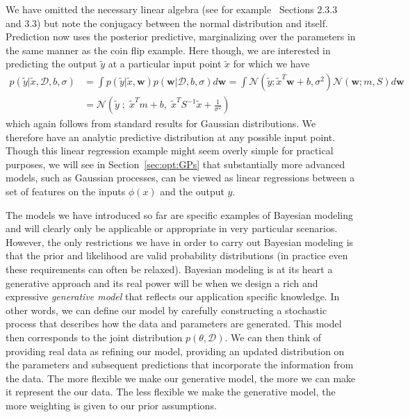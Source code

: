 We have omitted the necessary linear algebra (see for example~\cite{bishop2006pattern}
Sections 2.3.3 and 3.3)
but note the conjugacy between
the normal distribution and itself.  Prediction now uses the posterior predictive, marginalizing
over the parameters in the same manner as the coin flip example.  Here though, we are interested
in predicting the output $\tilde{y}$ at a particular input point $\tilde{x}$ for which we have
\begin{align}
p(\tilde{y}| \tilde{x},\mathcal{D}, b,\sigma) &= \int p(\tilde{y}| \tilde{x},\mathbf{w}) 
p(\mathbf{w}| \mathcal{D}, b,\sigma) d\mathbf{w} 
= \int \mathcal{N}(\tilde{y};\tilde{x}^T\mathbf{w}+b,\sigma^2)
\mathcal{N}\left(\mathbf{w} ; m, S\right) d\mathbf{w} \nonumber \\
&= \mathcal{N} \left(\tilde{y} \; ; \;\tilde{x}^Tm+b, \; \tilde{x}^T S^{-1}\tilde{x}+\frac{1}{\sigma^2} \right)
\end{align}
which again follows from standard results for Gaussian distributions.  We therefore have
an analytic predictive distribution at any possible input point.
Though this linear regression example might seem overly simple for practical purposes, we
will see in Section~\ref{sec:opt:GPs} that substantially more advanced models, such as
Gaussian processes, can be viewed as linear regressions between a set of features on the inputs $\phi(x)$
and the output $y$.

The models we have introduced so far are specific examples of Bayesian modeling and will
clearly only be applicable or appropriate in very particular scenarios.  However, the only restrictions we
have in order to carry out Bayesian modeling is that the prior and likelihood are valid probability distributions
(in practice even these requirements can often be relaxed).  Bayesian modeling is at its heart a
generative approach and its real power will be when we design a rich and expressive \emph{generative model} 
that reflects our application specific knowledge.  In other words, we can define our model
by carefully constructing a stochastic process that describes how the data and parameters are generated.
This model then corresponds to the joint distribution $p(\theta,\mathcal{D})$.
We can then think of providing real data as refining our model, providing an updated distribution
on the parameters and subsequent predictions that incorporate the information from the data.  The more
flexible we make our generative model, the more we can make it represent the our data.  The less flexible
we make the generative model, the more weighting is given to our prior assumptions.

